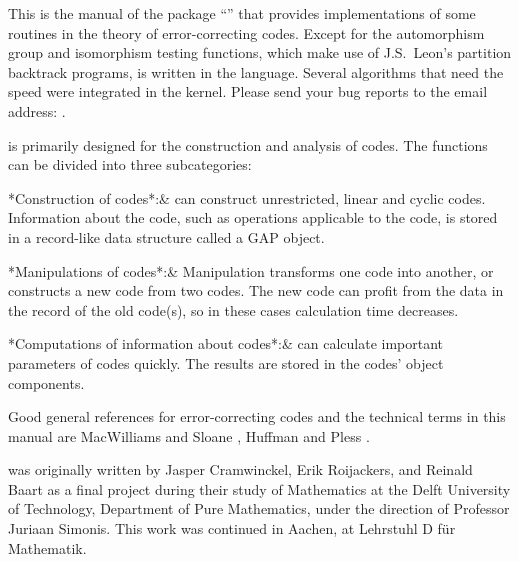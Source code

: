 %
%
%
%

This is the manual of the {\GAP} package ``{\GUAVA}'' 
that provides implementations of some routines in the theory of
error-correcting codes. Except for the automorphism group and isomorphism
testing functions, which make use of J.S.~Leon's partition 
backtrack programs, {\GUAVA} is written in the {\GAP} 
language. Several algorithms that need the speed were integrated 
in the {\GAP} kernel. Please send your bug reports to the 
email address: .

{\GUAVA} is  primarily  designed for the construction and analysis  of
codes.  The functions can be divided into three subcategories:

\beginitems

*Construction of codes*:&
{\GUAVA} can construct unrestricted, linear and cyclic
codes. Information about the code, such as operations applicable 
to the code, is stored in a record-like
data structure called a GAP object.

*Manipulations of codes*:&
Manipulation transforms  one code into  another, or constructs a new code
from two  codes. The new code can  profit from the  data in the record of
the old code(s), so in these cases calculation time decreases.

*Computations of information about codes*:&
{\GUAVA} can calculate important parameters
of codes quickly. The results are stored in the codes'
object components.

\enditems

Good general references for error-correcting codes and the 
technical terms in this manual are MacWilliams and Sloane \cite{MS83}, 
Huffman and Pless \cite{HP03}. 


{\GUAVA} was originally written by Jasper Cramwinckel, 
Erik Roijackers, and Reinald Baart as a final project during 
their study of Mathematics at the Delft
University of Technology, Department of Pure Mathematics,
under the direction of Professor Juriaan Simonis. 
This work was continued in Aachen, at Lehrstuhl D f\"ur Mathematik.

